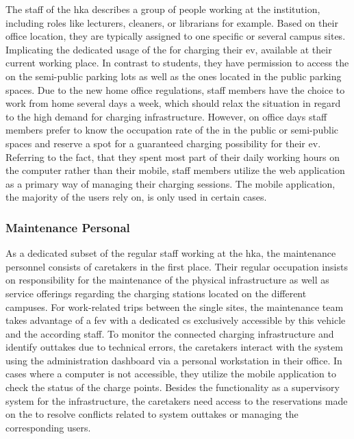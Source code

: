 The staff of the \acrshort{hka} describes a group of people working at the institution, including roles like lecturers, cleaners, or librarians for example.
Based on their office location, they are typically assigned to one specific or several campus sites. Implicating the dedicated usage of the  for charging their \acrshort{ev}, available at their current working place.
In contrast to students, they have permission to access the  on the semi-public parking lots as well as the ones located in the public parking spaces. 
Due to the new home office regulations, staff members have the choice to work from home several days a week, which should relax the situation in regard to the high demand for charging infrastructure.
However, on office days staff members prefer to know the occupation rate of the  in the public or semi-public spaces and reserve a spot for a guaranteed charging possibility for their \acrshort{ev}.
Referring to the fact, that they spent most part of their daily working hours on the computer rather than their mobile, staff members utilize the web application as a primary way of managing their charging sessions.
The mobile application, the majority of the users rely on, is only used in certain cases.

\subsubsection{Maintenance Personal}
\label{ch:Requirements Engineering:sec:Stakeholders:ssec:Staff:sssec:Maintenance Personal}

As a dedicated subset of the regular staff working at the \acrshort{hka}, the maintenance personnel consists of caretakers in the first place. Their regular occupation insists on responsibility for the maintenance of the physical infrastructure as well as service offerings regarding the charging stations located on the different campuses.
For work-related trips between the single sites, the maintenance team takes advantage of a \acrshort{fev} with a dedicated \acrshort{cs} exclusively accessible by this vehicle and the according staff.
To monitor the connected charging infrastructure and identify outtakes due to technical errors, the caretakers interact with the system using the administration dashboard via a personal workstation in their office. In cases where a computer is not accessible, they utilize the mobile application to check the status of the charge points.
Besides the functionality as a supervisory system for the infrastructure, the caretakers need access to the reservations made on the  to resolve conflicts related to system outtakes or managing the corresponding users.

